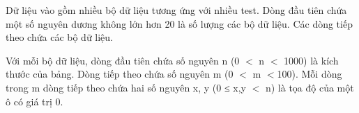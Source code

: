 Dữ liệu vào gồm nhiều bộ dữ liệu tương ứng với nhiều test. Dòng đầu tiên chứa một số nguyên dương không lớn hơn 20 là số lượng các bộ dữ liệu. Các dòng tiếp theo chứa các bộ dữ liệu.  

   Với mỗi bộ dữ liệu, dòng đầu tiên chứa số nguyên n (0 $<$ n $<$ 1000) là kích thước của bảng. Dòng tiếp theo chứa số nguyên m (0 $<$ m $<$100). Mỗi dòng trong m dòng tiếp theo chứa hai số nguyên x, y (0 ≤ x,y $<$ n)  là tọa độ của một ô có giá trị 0.  

\